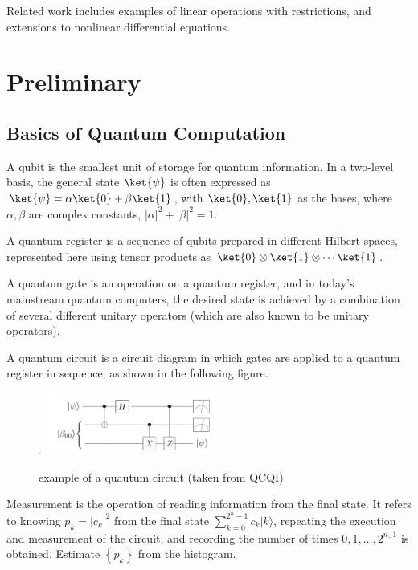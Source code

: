 \documentclass[b5paper,papersize,dvipdfmx,fleqn]{article}
\begin{document}
Related work includes examples of linear operations with restrictions, and extensions to nonlinear differential equations.

\section{Preliminary}
\subsection{Basics of Quantum Computation}
A qubit is the smallest unit of storage for quantum information. In a two-level basis, the general state $\ket{\psi }$ is often expressed as $\ket{\psi }=\alpha \ket{0}+\beta \ket{1}$, with $\ket{0}, \ket{1}$ as the bases, where $\alpha, \beta$ are complex constants, $|\alpha|^2 + |\beta|^2 = 1$.

A quantum register is a sequence of qubits prepared in different Hilbert spaces, represented here using tensor products as $\ket{0}\otimes \ket{1}\otimes \cdots \ket{1}$.

A quantum gate is an operation on a quantum register, and in today's mainstream quantum computers, the desired state is achieved by a combination of several different unitary operators (which are also known to be unitary operators).

A quantum circuit is a circuit diagram in which gates are applied to a quantum register in sequence, as shown in the following figure.
\begin{center}
  \begin{figure}[H].
    \centering
       \includegraphics[width=0.5\textwidth]{circuit.pdf}
       \caption{example of a quautum circuit (taken from QCQI)}
       \label{circuit}
  \end{figure}
\end{center}

Measurement is the operation of reading information from the final state. It refers to knowing $p_{k}=\left|c_{k}\right|^{2}$ from the final state $\sum_{k=0}^{2^{n}-1} c_{k}|k\rangle$, repeating the execution and measurement of the circuit, and recording the number of times $0,1, \ldots, 2^{n_{-} 1}$ is obtained. Estimate $\left\{p_{k}\right\}$ from the histogram.
\end{document}
